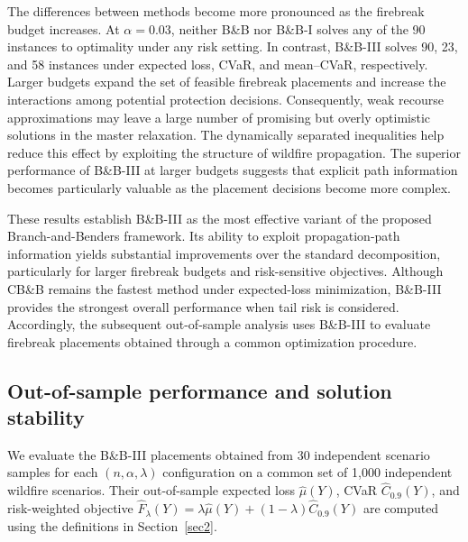 \documentclass{itor}
\begin{document}
The differences between methods become more pronounced as the firebreak budget increases. At $\alpha=0.03$, neither B\&B nor B\&B-I solves any of the 90 instances to optimality under any risk setting. In contrast, B\&B-III solves 90, 23, and 58 instances under expected loss, CVaR, and mean--CVaR, respectively. Larger budgets expand the set of feasible firebreak placements
and increase the interactions among potential protection decisions. Consequently, weak recourse approximations may leave a large number of promising but overly optimistic solutions in the master relaxation. The dynamically separated inequalities help reduce
this effect by exploiting the structure of wildfire propagation. The superior performance of B\&B-III at larger budgets suggests that explicit path information becomes particularly valuable as the placement decisions become more complex.


These results establish B\&B-III as the most effective variant of the proposed Branch-and-Benders framework. Its ability to exploit propagation-path information yields substantial improvements over the standard decomposition, particularly for larger firebreak budgets and risk-sensitive objectives. Although CB\&B remains the fastest method under expected-loss minimization, B\&B-III provides the strongest overall performance
when tail risk is considered. Accordingly, the subsequent
out-of-sample analysis uses B\&B-III to evaluate firebreak placements obtained through a common optimization procedure.

\subsection{Out-of-sample performance and solution stability}\label{sec:oos-stability}

We evaluate the B\&B-III placements obtained from 30 independent scenario
samples for each $(n,\alpha,\lambda)$ configuration on a common set of
1,000 independent wildfire scenarios. Their out-of-sample expected loss
$\widehat\mu(Y)$, CVaR $\widehat C_{0.9}(Y)$, and risk-weighted objective
$\widehat F_\lambda(Y)=\lambda\widehat\mu(Y)
+(1-\lambda)\widehat C_{0.9}(Y)$ are computed using the definitions
in Section~\ref{sec2}. 
\end{document}
